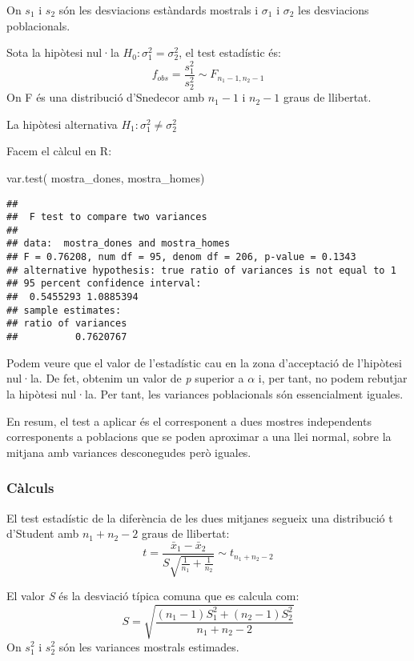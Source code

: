 \documentclass[
]{article}
\newenvironment{Shaded}{\begin{snugshade}}{\end{snugshade}}
\newcommand{\FunctionTok}[1]{\textcolor[rgb]{0.94,0.94,0.56}{#1}}
\newcommand{\NormalTok}[1]{\textcolor[rgb]{0.80,0.80,0.80}{#1}}
\begin{document}
On \(s_1\) i \(s_2\) són les desviacions estàndards mostrals i
\(\sigma_{1}\) i \(\sigma_{2}\) les desviacions poblacionals.

Sota la hipòtesi nul·la \(H_{0}: \sigma_{1}^{2}=\sigma_{2}^{2}\), el
test estadístic és:
\[ f_{obs}=\frac{s_{1}^{2}}{s_{2}^{2}}\sim F_{n_{1}-1,n_{2}-1}  \] On F
és una distribució d'Snedecor amb \(n_1-1\) i \(n_2-1\) graus de
llibertat.

La hipòtesi alternativa \(H_{1}: \sigma_{1}^{2}\neq \sigma_{2}^{2}\)

Facem el càlcul en R:

\begin{Shaded}
\begin{Highlighting}[]
\FunctionTok{var.test}\NormalTok{( mostra\_dones, mostra\_homes)}
\end{Highlighting}
\end{Shaded}

\begin{verbatim}
## 
##  F test to compare two variances
## 
## data:  mostra_dones and mostra_homes
## F = 0.76208, num df = 95, denom df = 206, p-value = 0.1343
## alternative hypothesis: true ratio of variances is not equal to 1
## 95 percent confidence interval:
##  0.5455293 1.0885394
## sample estimates:
## ratio of variances 
##          0.7620767
\end{verbatim}

Podem veure que el valor de l'estadístic cau en la zona d'acceptació de
l'hipòtesi nul·la. De fet, obtenim un valor de \emph{p} superior a
\(\alpha\) i, per tant, no podem rebutjar la hipòtesi nul·la. Per tant,
les variances poblacionals són essencialment iguales.

En resum, el test a aplicar és el corresponent a dues mostres
independents corresponents a poblacions que se poden aproximar a una
llei normal, sobre la mitjana amb variances desconegudes però iguales.

\hypertarget{cuxe0lculs}{%
\subsubsection{Càlculs}\label{cuxe0lculs}}

El test estadístic de la diferència de les dues mitjanes segueix una
distribució t d'Student amb \(n_{1}+n_{2}-2\) graus de llibertat:
\[ t=\frac{\bar{x}_{1}-\bar{x}_{2}}{S\sqrt{\frac{1}{n_{1}}+\frac{1}{n_{2}}}}\sim  t_{n_{1}+n_{2}-2} \]

El valor \emph{S} és la desviació típica comuna que es calcula com:
\[ S=\sqrt{\frac{(n_1-1)S_1^2+(n_2-1)S_2^2}{n_1+n_2-2}} \] On \(s_1^2\)
i \(s_2^2\) són les variances mostrals estimades.
\end{document}
